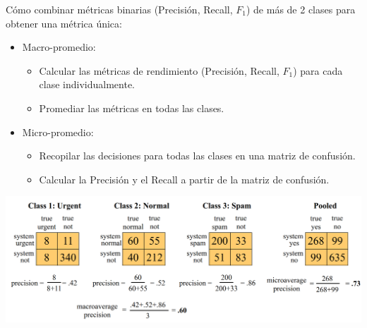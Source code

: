 Cómo combinar métricas binarias (Precisión, Recall, $F_1$) de más de 2 clases para obtener una métrica única:
\begin{itemize}
 \item Macro-promedio:
 \begin{itemize}
    \item Calcular las métricas de rendimiento (Precisión, Recall, $F_1$) para cada clase individualmente.
    \item Promediar las métricas en todas las clases.
 \end{itemize}
 \item Micro-promedio:
 \begin{itemize}
    \item Recopilar las decisiones para todas las clases en una matriz de confusión.
    \item Calcular la Precisión y el Recall a partir de la matriz de confusión.
 \end{itemize}
\end{itemize}

\begin{center}
\includegraphics[scale=0.23]{pics/confmatrixmulti.png}
\end{center}
